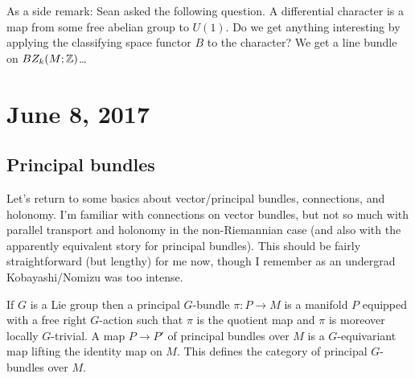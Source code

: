 \documentclass{amsart}
\begin{document}

As a side remark: Sean asked the following question. A differential character
is a map from some free abelian group to $U(1)$. Do we get anything interesting by
applying the classifying space functor $B$ to the character? We get a line bundle on
$BZ_k(M;\mathbb{Z})$\ldots

\section{June 8, 2017}

\subsection{Principal bundles}
Let's return to some basics about vector/principal bundles, connections, and holonomy.
I'm familiar with connections on vector bundles, but not so much with parallel transport
and holonomy in the non-Riemannian case (and also with the apparently equivalent story
for principal bundles). This should be fairly straightforward (but lengthy) for me now,
though I remember as an undergrad Kobayashi/Nomizu was too intense.

If $G$ is a Lie group then a principal $G$-bundle $\pi:P\to M$ is a manifold $P$
equipped with a free right $G$-action such that $\pi$ is the quotient map and
$\pi$ is moreover locally $G$-trivial. A map $P\to P'$ of principal bundles over $M$
is a $G$-equivariant map lifting the identity map on $M$. This defines the category
of principal $G$-bundles over $M$.
\end{document}
